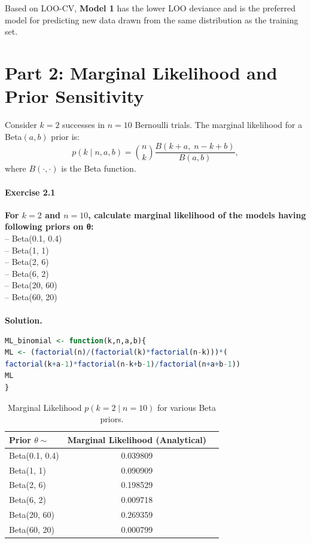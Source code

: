 \documentclass[12pt]{scrartcl}
\begin{document}
Based on LOO-CV, \textbf{Model 1} has the lower LOO deviance and is the preferred model for predicting new data drawn from the same distribution as the training set.
\newpage
\section*{Part 2: Marginal Likelihood and Prior Sensitivity}

Consider $k=2$ successes in $n=10$ Bernoulli trials. The marginal likelihood for a Beta$(a,b)$ prior is:
\[
  p(k \mid n, a, b) = \binom{n}{k}\frac{B(k+a,\; n-k+b)}{B(a,b)},
\]
where $B(\cdot,\cdot)$ is the Beta function.

\paragraph*{Exercise 2.1} \textbf{For $k=2$ and $n=10$, calculate marginal likelihood of the models having following priors on θ:}\\
– Beta(0.1, 0.4)\\
– Beta(1, 1)\\
– Beta(2, 6)\\
– Beta(6, 2)\\
– Beta(20, 60)\\
– Beta(60, 20)\\ \\
\textbf{Solution.}

\begin{lstlisting}[language=R, caption=Calculating Marginal Likelihood for Bernoulli Trials]
ML_binomial <- function(k,n,a,b){
ML <- (factorial(n)/(factorial(k)*factorial(n-k)))*(
factorial(k+a-1)*factorial(n-k+b-1)/factorial(n+a+b-1))
ML
}
\end{lstlisting}

\begin{table}[H]
\centering
\caption{Marginal Likelihood $p(k=2 \mid n=10)$ for various Beta priors.}
\label{tab:ml}
\begin{tabular}{lcc}
\toprule
Prior $\theta \sim $ & Marginal Likelihood (Analytical) \\
\midrule
Beta(0.1, 0.4) & 0.039809 \\
Beta(1, 1)     & 0.090909 \\
Beta(2, 6)     & 0.198529 \\
Beta(6, 2)     & 0.009718 \\
Beta(20, 60)   & 0.269359 \\
Beta(60, 20)   & 0.000799 \\
\bottomrule
\end{tabular}
\end{table}
\end{document}
